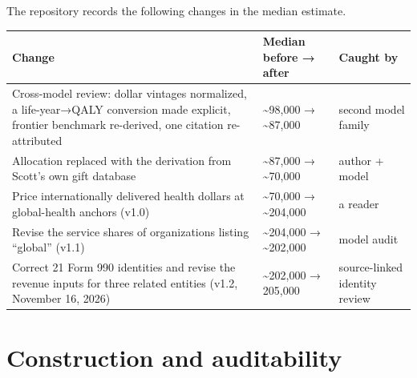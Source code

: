 \documentclass[
  11pt,
  letterpaper,
  DIV=11,
  numbers=noendperiod]{scrartcl}
\newcounter{none} %
\begin{document}
The repository records the following changes in the median estimate.

{\def\LTcaptype{none} %
\begin{longtable}[]{@{}
  >{\raggedright\arraybackslash}p{}
  >{\raggedright\arraybackslash}p{}
  >{\raggedright\arraybackslash}p{}@{}}
\toprule\noalign{}
\begin{minipage}[b]{\linewidth}\raggedright
Change
\end{minipage} & \begin{minipage}[b]{\linewidth}\raggedright
Median before → after
\end{minipage} & \begin{minipage}[b]{\linewidth}\raggedright
Caught by
\end{minipage} \\
\midrule\noalign{}
\endhead
\bottomrule\noalign{}
\endlastfoot
Cross-model review: dollar vintages normalized, a life-year→QALY
conversion made explicit, frontier benchmark re-derived, one citation
re-attributed & \textasciitilde98,000 → \textasciitilde87,000 & second
model family \\
Allocation replaced with the derivation from Scott's own gift database &
\textasciitilde87,000 → \textasciitilde70,000 & author + model \\
Price internationally delivered health dollars at global-health anchors
(v1.0) & \textasciitilde70,000 → \textasciitilde204,000 & a reader \\
Revise the service shares of organizations listing ``global'' (v1.1) &
\textasciitilde204,000 → \textasciitilde202,000 & model audit \\
Correct 21 Form 990 identities and revise the revenue inputs for three
related entities (v1.2, November 16, 2026) & \textasciitilde202,000 →
205,000 & source-linked identity review \\
\end{longtable}
}

\section{Construction and
auditability}\label{construction-and-auditability}
\end{document}
